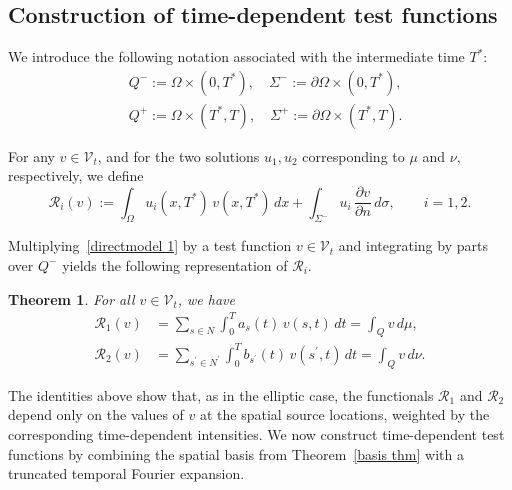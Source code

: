 \documentclass[12pt]{amsart}
\newtheorem{thm}{Theorem}
\begin{document}
\subsection{Construction of time-dependent test functions}

We introduce the following notation associated with the intermediate time \(T^*\):
\begin{align*}
    &Q^{-} := \Omega \times (0, T^*), \quad \Sigma^{-} := \partial\Omega \times (0, T^*), \\
    &Q^{+} := \Omega \times (T^*, T), \quad \Sigma^{+} := \partial\Omega \times (T^*, T).
\end{align*}

For any \(v \in \mathcal{V}_t\), and for the two solutions \(u_1,u_2\) corresponding to \(\mu\) and \(\nu\), respectively, we define
\begin{equation}\label{parafunctionalR}
    \mathcal{R}_i(v) 
    := \int_\Omega u_i(x, T^*)\, v(x, T^*) \, dx
       + \int_{\Sigma^-} u_i\,\frac{\partial v}{\partial n} \, d\sigma,
    \qquad i=1,2.
\end{equation}

Multiplying~\eqref{directmodel 1} by a test function \(v \in \mathcal{V}_t\) and integrating by parts over \(Q^-\) yields the following representation of \(\mathcal{R}_i\).

\begin{thm}
    For all \(v\in \mathcal{V}_t\), we have
    \begin{align*}
        \mathcal{R}_1(v)
            &= \sum_{s\in N} \int_{0}^{T} a_s(t)\,v(s,t)\,dt
             = \int_{Q} v\,d\mu,\\
        \mathcal{R}_2(v)
            &= \sum_{s^{\prime}\in N^{\prime}}\int_{0}^{T} b_{s^{\prime}}(t)\,v(s^{\prime},t)\,dt
             = \int_{Q} v\,d\nu.
    \end{align*}
\end{thm}

The identities above show that, as in the elliptic case, the functionals \(\mathcal{R}_1\) and \(\mathcal{R}_2\) depend only on the values of \(v\) at the spatial source locations, weighted by the corresponding time-dependent intensities.
We now construct time-dependent test functions by combining the spatial basis from Theorem~\ref{basis thm} with a truncated temporal Fourier expansion.
\end{document}

